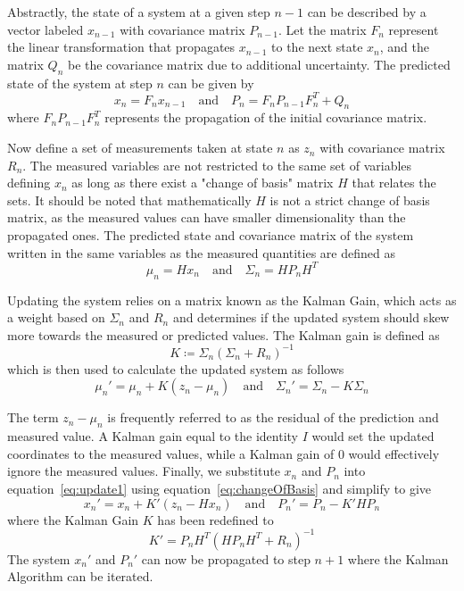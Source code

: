Abstractly, the state of a system at a given step $n-1$ can be described by a vector labeled $x_{n-1}$ with covariance matrix $P_{n-1}$. Let the matrix $F_n$ represent the linear transformation that propagates $x_{n-1}$ to the next state $x_{n}$, and the matrix $Q_{n}$ be the covariance matrix due to additional uncertainty. The predicted state of the system at step $n$ can be given by
\begin{equation}
	\label{eq:prop}
	x_{n}=F_{n}x_{n-1} \quad \textrm{and} \quad P_{n}=F_nP_{n-1}F_n^T+Q_n
\end{equation}
where $F_nP_{n-1}F_n^T$ represents the propagation of the initial covariance matrix.

Now define a set of measurements taken at state $n$ as $z_n$ with covariance matrix $R_n$. The measured variables are not restricted to the same set of variables defining $x_n$ as long as there exist a "change of basis" matrix $H$ that relates the sets. It should be noted that mathematically $H$ is not a strict change of basis matrix, as the measured values can have smaller dimensionality than the propagated ones. The predicted state and covariance matrix of the system written in the same variables as the measured quantities are defined as
\begin{equation}
	\label{eq:changeOfBasis}
	\mu_n=Hx_n \quad \textrm{and} \quad \Sigma_n=HP_nH^{T}
\end{equation}

Updating the system relies on a matrix known as the Kalman Gain, which acts as a weight based on $\Sigma_n$ and $R_n$ and determines if the updated system should skew more towards the measured or predicted values. The Kalman gain is defined as
\begin{equation}
	\label{eq:gain}
	K\coloneqq \Sigma_n\left(\Sigma_n+R_n\right)^{-1}
\end{equation}
which is then used to calculate the updated system as follows
\begin{equation}
	\label{eq:update1}
	\mu_n'=\mu_n+K\left(z_n-\mu_n\right) \quad \textrm{and} \quad \Sigma_n'=\Sigma_n-K\Sigma_n
\end{equation}

The term $z_n-\mu_n$ is frequently referred to as the residual of the prediction and measured value. A Kalman gain equal to the identity $I$ would set the updated coordinates to the measured values, while a Kalman gain of $0$ would effectively ignore the measured values. Finally, we substitute $x_n$ and $P_n$ into equation~\ref{eq:update1} using equation~\ref{eq:changeOfBasis} and simplify to give
\begin{equation}
	x_n'=x_n+K'(z_n-Hx_n) \quad \mathrm{and} \quad P_n'= P_n-K'HP_n
\end{equation}
where the Kalman Gain $K$ has been redefined to
\begin{equation} \label{eq:gain2}
	K'=P_nH^T(HP_nH^T+R_n)^{-1}
\end{equation}
The system $x_n'$ and $P_n'$ can now be propagated to step $n+1$ where the Kalman Algorithm can be iterated.

